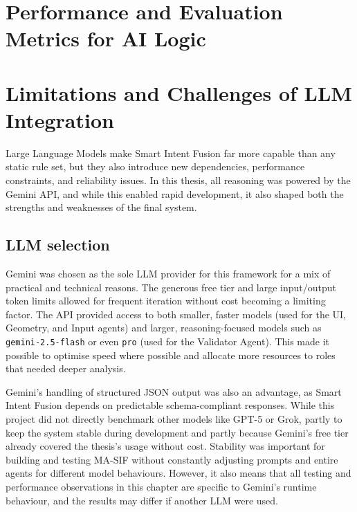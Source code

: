 \documentclass[openany]{book}
\begin{document}
\section{Performance and Evaluation Metrics for AI Logic}

\section{Limitations and Challenges of LLM Integration}
Large Language Models make Smart Intent Fusion far more capable than any static rule set, but they also introduce new dependencies, performance constraints, and reliability issues. In this thesis, all reasoning was powered by the Gemini API, and while this enabled rapid development, it also shaped both the strengths and weaknesses of the final system.

\subsection{LLM selection}
Gemini was chosen as the sole LLM provider for this framework for a mix of practical and technical reasons. The generous free tier and large input/output token limits allowed for frequent iteration without cost becoming a limiting factor. The API provided access to both smaller, faster models (used for the UI, Geometry, and Input agents) and larger, reasoning-focused models such as \texttt{gemini-2.5-flash} or even \texttt{pro} (used for the Validator Agent). This made it possible to optimise speed where possible and allocate more resources to roles that needed deeper analysis.

Gemini’s handling of structured JSON output was also an advantage, as Smart Intent Fusion depends on predictable schema-compliant responses. While this project did not directly benchmark other models like GPT-5 or Grok, partly to keep the system stable during development and partly because Gemini’s free tier already covered the thesis’s usage without cost. Stability was important for building and testing MA-SIF without constantly adjusting prompts and entire agents for different model behaviours. However, it also means that all testing and performance observations in this chapter are specific to Gemini’s runtime behaviour, and the results may differ if another LLM were used.
\end{document}
